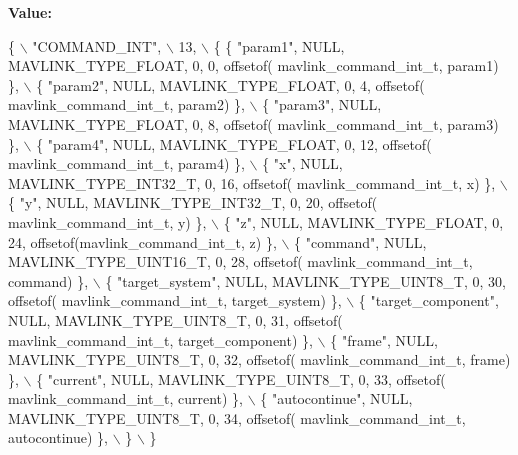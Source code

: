 {\bfseries Value\+:}
\begin{DoxyCode}
\{ \(\backslash\)
    \textcolor{stringliteral}{"COMMAND\_INT"}, \(\backslash\)
    13, \(\backslash\)
    \{  \{ \textcolor{stringliteral}{"param1"}, NULL, MAVLINK_TYPE_FLOAT, 0, 0, offsetof(
      mavlink_command_int_t, param1) \}, \(\backslash\)
         \{ \textcolor{stringliteral}{"param2"}, NULL, MAVLINK_TYPE_FLOAT, 0, 4, offsetof(
      mavlink_command_int_t, param2) \}, \(\backslash\)
         \{ \textcolor{stringliteral}{"param3"}, NULL, MAVLINK_TYPE_FLOAT, 0, 8, offsetof(
      mavlink_command_int_t, param3) \}, \(\backslash\)
         \{ \textcolor{stringliteral}{"param4"}, NULL, MAVLINK_TYPE_FLOAT, 0, 12, offsetof(
      mavlink_command_int_t, param4) \}, \(\backslash\)
         \{ \textcolor{stringliteral}{"x"}, NULL, MAVLINK_TYPE_INT32_T, 0, 16, offsetof(
      mavlink_command_int_t, x) \}, \(\backslash\)
         \{ \textcolor{stringliteral}{"y"}, NULL, MAVLINK_TYPE_INT32_T, 0, 20, offsetof(
      mavlink_command_int_t, y) \}, \(\backslash\)
         \{ \textcolor{stringliteral}{"z"}, NULL, MAVLINK_TYPE_FLOAT, 0, 24, offsetof(mavlink_command_int_t, z) \}, \(\backslash\)
         \{ \textcolor{stringliteral}{"command"}, NULL, MAVLINK_TYPE_UINT16_T, 0, 28, offsetof(
      mavlink_command_int_t, command) \}, \(\backslash\)
         \{ \textcolor{stringliteral}{"target\_system"}, NULL, MAVLINK_TYPE_UINT8_T, 0, 30, offsetof(
      mavlink_command_int_t, target\_system) \}, \(\backslash\)
         \{ \textcolor{stringliteral}{"target\_component"}, NULL, MAVLINK_TYPE_UINT8_T, 0, 31, offsetof(
      mavlink_command_int_t, target\_component) \}, \(\backslash\)
         \{ \textcolor{stringliteral}{"frame"}, NULL, MAVLINK_TYPE_UINT8_T, 0, 32, offsetof(
      mavlink_command_int_t, frame) \}, \(\backslash\)
         \{ \textcolor{stringliteral}{"current"}, NULL, MAVLINK_TYPE_UINT8_T, 0, 33, offsetof(
      mavlink_command_int_t, current) \}, \(\backslash\)
         \{ \textcolor{stringliteral}{"autocontinue"}, NULL, MAVLINK_TYPE_UINT8_T, 0, 34, offsetof(
      mavlink_command_int_t, autocontinue) \}, \(\backslash\)
         \} \(\backslash\)
\}
\end{DoxyCode}
\mbox{\label{mavlink__msg__command__int_8h_ab49c8fb669efc1d240d03571fe1ab42f}} 
